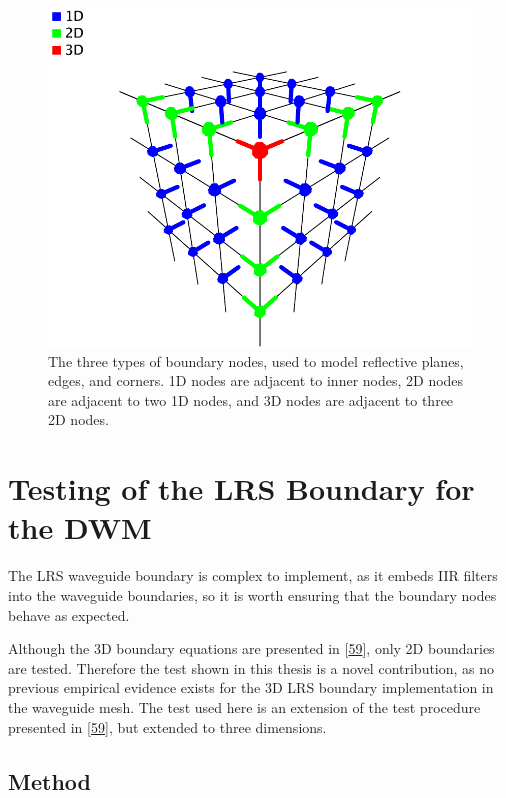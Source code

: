\documentclass[]{scrreprt}
\begin{document}
\begin{figure}[htbp]
\centering
\includegraphics{images/boundary_diagram.pdf}
\caption{The three types of boundary nodes, used to model reflective
planes, edges, and corners. 1D nodes are adjacent to inner nodes, 2D
nodes are adjacent to two 1D nodes, and 3D nodes are adjacent to three
2D nodes.\label{fig:boundary_type_diagram}}
\end{figure}

\section{Testing of the LRS Boundary for the
DWM}\label{testing-of-the-lrs-boundary-for-the-dwm}

The LRS waveguide boundary is complex to implement, as it embeds IIR
filters into the waveguide boundaries, so it is worth ensuring that the
boundary nodes behave as expected.

Although the 3D boundary equations are presented in
{[}\protect\hyperlink{ref-kowalczykux5fmodelingux5f2008}{59}{]}, only 2D
boundaries are tested. Therefore the test shown in this thesis is a
novel contribution, as no previous empirical evidence exists for the 3D
LRS boundary implementation in the waveguide mesh. The test used here is
an extension of the test procedure presented in
{[}\protect\hyperlink{ref-kowalczykux5fmodelingux5f2008}{59}{]}, but
extended to three dimensions.

\subsection{Method}\label{method-1}
\end{document}
